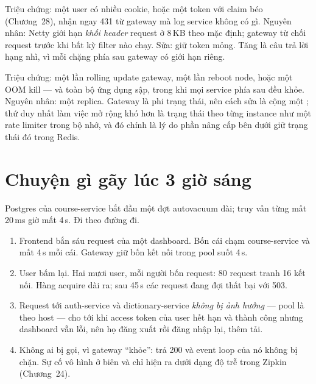 \begin{pitfall}
Triệu chứng: một user có nhiều cookie, hoặc một token với claim béo
(Chương~28), nhận ngay 431 từ gateway mà log service không có gì.
Nguyên nhân: Netty giới hạn \emph{khối header} request ở 8\,KB theo mặc
định; gateway từ chối request trước khi bất kỳ filter nào chạy. Sửa:
giữ token mỏng. Tăng  là câu
trả lời hạng nhì, vì mỗi chặng phía sau gateway có giới hạn riêng.
\end{pitfall}

\begin{pitfall}
Triệu chứng: một lần rolling update gateway, một lần reboot node, hoặc
một OOM kill --- và toàn bộ ứng dụng sập, trong khi mọi service phía
sau đều khỏe. Nguyên nhân: một replica. Gateway là phi trạng thái, nên
cách sửa là  cộng một ;
thứ duy nhất làm việc mở rộng khó hơn là trạng thái theo từng instance
như một rate limiter trong bộ nhớ, và đó chính là lý do phần nâng cấp
bên dưới giữ trạng thái đó trong Redis.
\end{pitfall}

\section{Chuyện gì gãy lúc 3 giờ sáng}

Postgres của course-service bắt đầu một đợt autovacuum dài; truy vấn
từng mất 20\,ms giờ mất 4\,s. Đi theo đường đi.

\begin{enumerate}
  \item Frontend bắn sáu request của một dashboard. Bốn cái chạm
  course-service và mất 4\,s mỗi cái. Gateway giữ bốn kết nối trong
  pool suốt 4\,s.
  \item User bấm lại. Hai mươi user, mỗi người bốn request: 80 request
  tranh 16 kết nối. Hàng acquire dài ra; sau 45\,s các request đang đợi
  thất bại với 503.
  \item Request tới auth-service và dictionary-service \emph{không bị
  ảnh hưởng} --- pool là theo host --- cho tới khi access token của user
  hết hạn và  thành công nhưng dashboard vẫn lỗi, nên họ
  đăng xuất rồi đăng nhập lại, thêm tải.
  \item Không ai bị gọi, vì gateway ``khỏe'': 
  trả 200 và event loop của nó không bị chặn. Sự cố vô hình ở biên và
  chỉ hiện ra dưới dạng độ trễ trong Zipkin (Chương~24).
\end{enumerate}

